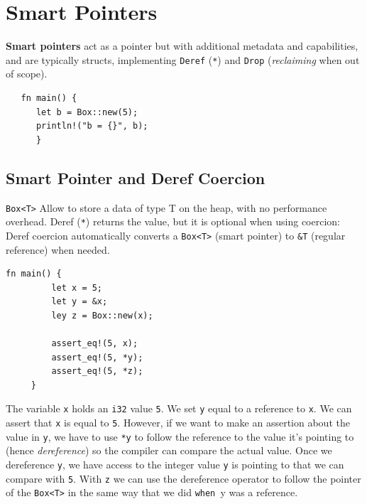 \section{Smart Pointers}
\textbf{Smart pointers} act as a pointer but with additional metadata and capabilities, and are typically structs, implementing \texttt{Deref} (\lstinline|*|) and
\texttt{Drop} (\textit{reclaiming} when out of scope).

\begin{lstlisting}
   fn main() {
      let b = Box::new(5);
      println!("b = {}", b);
      }
\end{lstlisting}

\subsection{Smart Pointer and Deref Coercion}
\lstinline|Box<T>| Allow to store a data of type T on the heap, with no performance overhead.
Deref (\lstinline|*|) returns the value, but it is optional when using coercion:
Deref coercion automatically converts a \lstinline|Box<T>| (smart pointer) to \lstinline|&T| (regular reference) when needed.

\begin{paracol}{2}
   \colfill
   \begin{lstlisting}[caption={Basic reference and dereference}]
      fn main() {
         let x = 5;
         let y = &x;
         ley z = Box::new(x);
     
         assert_eq!(5, x);
         assert_eq!(5, *y);
         assert_eq!(5, *z);
     }   
   \end{lstlisting}
   \colfill
   
   \switchcolumn

   The variable \lstinline|x| holds an \lstinline|i32| value \lstinline|5|. We set \lstinline|y| equal to a reference to \lstinline|x|. We can assert that \lstinline|x| is equal to \lstinline|5|. However, if we want to make an assertion about the value in \lstinline|y|, we have to use \lstinline|*y| to follow the reference to the value it's pointing to (hence \textit{dereference}) so the compiler can compare the actual value. Once we dereference \lstinline|y|, we have access to the integer value \lstinline|y| is pointing to that we can compare with \lstinline|5|.
   With \lstinline|z| we can use the dereference operator to follow the pointer of the \lstinline|Box<T>| in the same way that we did \lstinline|when |y was a reference.

\end{paracol}

